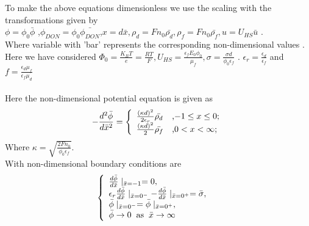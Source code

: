 \documentclass[11 pt]{article}
\begin{document}
To make the above equations dimensionless we use the scaling with the transformations given by\\ $\phi=\phi_{0}\bar{\phi}$ ,$\phi_{DON}=\phi_{0}\bar{\phi_{DON}}$,$ x=d\bar{x},\rho_{d}=Fn_{0}\bar{\rho_{d}},\rho_{f}=Fn_{0}\bar{\rho_{f}},u=U_{HS}\bar{u}$ .\\
Where variable with 'bar' represents the corresponding non-dimensional values . Here we have considered $\Phi_{0}=\frac{K_{B}T}{e}=\frac{RT}{F}, U_{HS}=\frac{\epsilon_{f}E_{0}\phi_{0}}{\mu_{f}},\sigma=\frac{\sigma d}{\phi_{0}\epsilon_{f}}$ . $\epsilon_{r}=\frac{\epsilon_{d}}{\epsilon_{f}}$ and $f=\frac{\epsilon_{d}\mu_{f}}{\epsilon_{f}\mu_{d}}$\\ \\
Here the non-dimensional potential equation is given as
\begin{equation}
 -\frac{d^{2}\bar\phi}{d\bar x^{2}}=\left\{
                                                                  \begin{array}{ll}
                                                                     \frac{(\kappa d)^{2}}{2\epsilon_{r}}\bar{\rho_{d}} & \hbox{,$-1 \leq x \leq0$;} \\
                                                                    \frac{(\kappa d)^{2}}{2}\bar{\rho_{f}}& \hbox{,$0 < x <\infty$;} \\
                                                                  \end{array}
                                                                 \right.
                                                               \label{5}
\end{equation}
Where $\kappa=\sqrt{\frac{2Fn_{0}}{\phi_{0}\epsilon_{f}}}$.\\
With non-dimensional boundary conditions are \\
\begin{equation}
 \left\{
                                                                  \begin{array}{ll}
                                                              \frac{d \bar\phi}{d\bar x} \mid_{\bar x=-1}=0, &  \\
                                                              \epsilon_{r} \frac{d\bar \phi}{d\bar x} \mid_{\bar x=0^{-}}- \frac{d \bar\phi}{d\bar x} \mid_{\bar x=0^{+}}=\bar \sigma,   &  \\
                                                                  \bar\phi \mid_{\bar x=0^{-}}=\bar\phi \mid_{\bar x=0^{+}}, &\\
                                                                  \bar\phi\rightarrow 0 \hspace{.2cm} \text{as} \hspace{.2cm} \bar x \rightarrow \infty
                                                                  \end{array}
                                                                 \right.
                                                               \label{6}
\end{equation}
\end{document}
